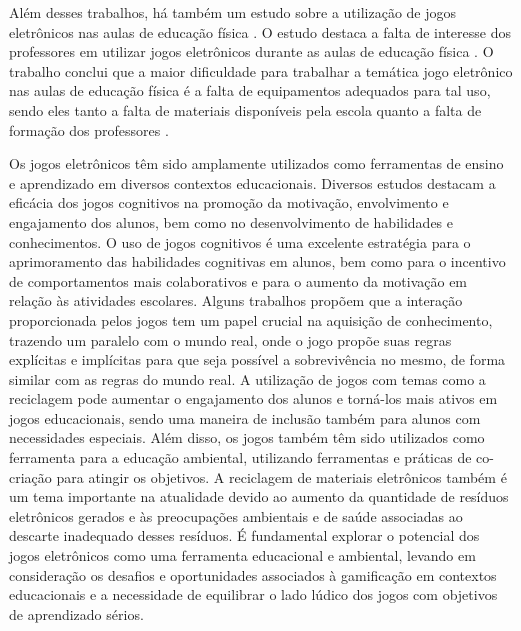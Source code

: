 Além desses trabalhos, há também um estudo sobre a utilização de jogos eletrônicos nas aulas de educação física \cite{jogos-educacao-fisica}. O estudo destaca a falta de interesse dos professores em utilizar jogos eletrônicos durante as aulas de educação física \cite{jogos-educacao-fisica}. O trabalho conclui que a maior dificuldade para trabalhar a temática jogo eletrônico nas aulas de educação física é a falta de equipamentos adequados para tal uso, sendo eles tanto a falta de materiais disponíveis pela escola quanto a falta de formação dos professores \cite{jogos-educacao-fisica}.

Os jogos eletrônicos têm sido amplamente utilizados como ferramentas de ensino e aprendizado em diversos contextos educacionais. Diversos estudos destacam a eficácia dos jogos cognitivos na promoção da motivação, envolvimento e engajamento dos alunos, bem como no desenvolvimento de habilidades e conhecimentos. O uso de jogos cognitivos é uma excelente estratégia para o aprimoramento das habilidades cognitivas em alunos, bem como para o incentivo de comportamentos mais colaborativos e para o aumento da motivação em relação às atividades escolares. Alguns trabalhos propõem que a interação proporcionada pelos jogos tem um papel crucial na aquisição de conhecimento, trazendo um paralelo com o mundo real, onde o jogo propõe suas regras explícitas e implícitas para que seja possível a sobrevivência no mesmo, de forma similar com as regras do mundo real. A utilização de jogos com temas como a reciclagem pode aumentar o engajamento dos alunos e torná-los mais ativos em jogos educacionais, sendo uma maneira de inclusão também para alunos com necessidades especiais. Além disso, os jogos também têm sido utilizados como ferramenta para a educação ambiental, utilizando ferramentas e práticas de co-criação para atingir os objetivos. A reciclagem de materiais eletrônicos também é um tema importante na atualidade devido ao aumento da quantidade de resíduos eletrônicos gerados e às preocupações ambientais e de saúde associadas ao descarte inadequado desses resíduos. É fundamental explorar o potencial dos jogos eletrônicos como uma ferramenta educacional e ambiental, levando em consideração os desafios e oportunidades associados à gamificação em contextos educacionais e a necessidade de equilibrar o lado lúdico dos jogos com objetivos de aprendizado sérios.
